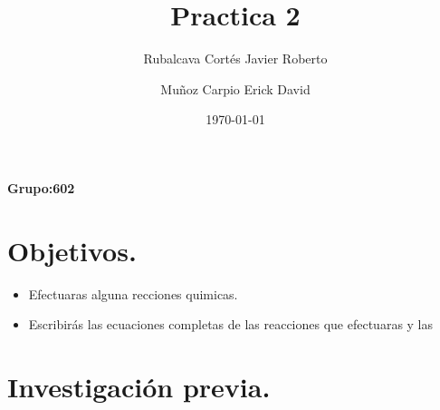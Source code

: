 \documentclass[letter]{article}
\title{Practica 2}
\author{
Rubalcava Cortés Javier Roberto
\and 
Muñoz Carpio Erick David
}
\date{\today}
\begin{document}
\maketitle
\begin{center}
    \textbf{Grupo:602}
\end{center}

\newpage

 
\tableofcontents{}
\newpage



\section{Objetivos.}

\begin{itemize}
    \item Efectuaras alguna recciones quimicas.
    \item Escribirás las ecuaciones completas de las reacciones que efectuaras y las
\end{itemize}

\section{Investigación previa.}
\end{document}
